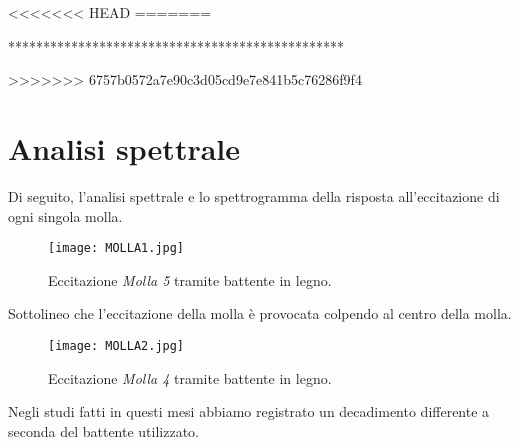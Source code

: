 <<<<<<< HEAD
=======
\clearpage

************************************************

>>>>>>> 6757b0572a7e90c3d05cd9e7e841b5c76286f9f4
\section{Analisi spettrale}

Di seguito, l'analisi spettrale e lo spettrogramma della risposta all'eccitazione di ogni singola molla. 

\begin{figure}[!h]
\begin{center}
\texttt{[image: MOLLA1.jpg]}
\caption{Eccitazione \textit{Molla 5} tramite battente in legno.}
\label{default}
\end{center}
\end{figure}

Sottolineo che l'eccitazione della molla è provocata colpendo al centro della molla. 

\begin{figure}[!h]
\begin{center}
\texttt{[image: MOLLA2.jpg]}
\caption{Eccitazione \textit{Molla 4} tramite battente in legno.}
\label{default}
\end{center}
\end{figure}

Negli studi fatti in questi mesi abbiamo registrato un decadimento differente a seconda del battente utilizzato.

